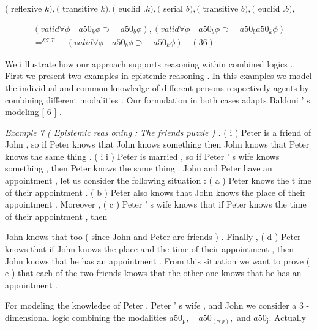 \documentclass[10pt]{article}
\begin{document}
\centerline{( reflexive  $ k  )  ,   ( $  transitive  $ k  )  ,   ( $  euclid  $ .   k  )  ,   ( $  serial  $ b  )  ,   ( $  transitive  $ b  )  ,   ( $  euclid  $ .   b  )  , $  }

\[\begin{aligned} (  valid   \forall  \phi  \quad  a50 _{ k }  \phi   \supset  \quad  a50 _{ b }  \phi  )  ,   (  valid   \forall  \phi  \quad  a50 _{ b }  \phi   \supset  \quad  a50 _{ b }  a50 _{ k }  \phi  ) \\
  = ^{ \mathcal{STT} } \quad  (  valid   \forall  \phi  \quad  a50 _{ b }  \phi   \supset  \quad  a50 _{ k }  \phi  )  \quad  (  36  ) \end{aligned}\]



\newpage
{}  

\noindent We i llustrate how our approach supports reasoning within combined logics . First 
 we present two examples in epistemic reasoning . In this examples we model the 
 individual and common knowledge of different persons respectively agents by 
 combining different modalities . Our formulation in both cases adapts Baldoni ' s 
 modeling [ 6 ] . 

\noindent \textit{Example 7 ( Epistemic reas oning : } \quad \textit{The friends puzzle ) . } \quad ( i ) Peter is a friend of 
 John , so if Peter knows that John knows something then John knows that Peter 
 knows the same thing . ( i i ) Peter is married , so if Peter ' s wife knows something , 
 then Peter knows the same thing . John and Peter have an appointment , let us 
 consider the following situation : ( a ) Peter knows the t ime of their appointment . 
 ( b ) Peter also knows that John knows the place of their appointment . Moreover , 
 ( c ) Peter ' s wife knows that if Peter knows the time of their appointment , then 

\noindent John knows that too ( since John and Peter are friends ) . Finally , ( d ) Peter knows 
 that if John knows the place and the time of their appointment , then John knows 
 that he has an appointment . From this situation we want to prove ( e ) that each 
 of the two friends knows that the other one knows that he has an appointment . 

For modeling the knowledge of Peter , Peter ' s wife , and John we consider 
 a 3 - dimensional logic combining the modalities \quad  $ a50 _{ \mathrm{p} } ,  \quad  a50 _{ (  \mathrm{w}  \mathrm{p}  ) } , $  \quad and \quad  $ a50 _{ \mathrm{j} }  . $  Actually 
\end{document}
